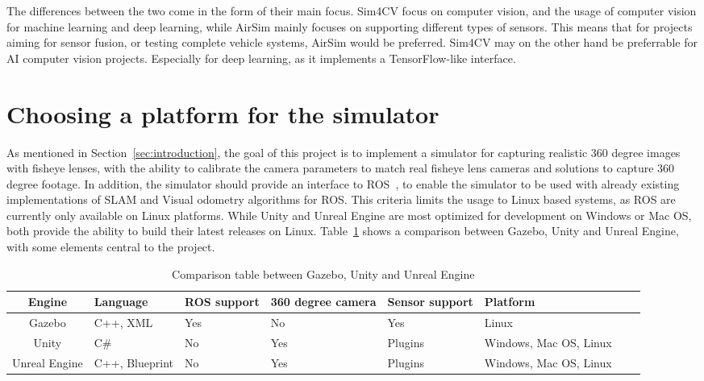 The differences between the two come in the form of their main focus. Sim4CV focus on computer vision, and the usage of computer vision for machine learning and deep learning, while AirSim mainly focuses on supporting different types of sensors. This means that for projects aiming for sensor fusion, or testing complete vehicle systems, AirSim would be preferred. Sim4CV may on the other hand be preferrable for AI computer vision projects. Especially for deep learning, as it implements a TensorFlow-like interface.

\section{Choosing a platform for the simulator}

As mentioned in Section~\ref{sec:introduction}, the goal of this project is to implement a simulator for capturing realistic 360 degree images with fisheye lenses, with the ability to calibrate the camera parameters to match real fisheye lens cameras and solutions to capture 360 degree footage. In addition, the simulator should provide an interface to ROS~\cite{ROSpaper}, to enable the simulator to be used with already existing implementations of SLAM and Visual odometry algorithms for ROS. This criteria limits the usage to Linux based systems, as ROS are currently only available on Linux platforms. While Unity and Unreal Engine are most optimized for development on Windows or Mac OS, both provide the ability to build their latest releases on Linux. Table~\ref{tab:platform_comparison} shows a comparison between Gazebo, Unity and Unreal Engine, with some elements central to the project.

\begin{table}[!htb]
    \centering
    \begin{tabular}{|c|>{\centering\arraybackslash}m{2cm}|>{\centering\arraybackslash}m{2cm}|>{\centering\arraybackslash}m{2.5cm}|>{\centering\arraybackslash}m{2cm}|>{\centering\arraybackslash}m{2cm}|>{\centering\arraybackslash}m{2cm}|>{\centering\arraybackslash}m{2cm}|} \hline
        \textbf{Engine}          & \textbf{Language}  & \textbf{ROS support} & \textbf{360 degree camera}   & \textbf{Sensor support} & \textbf{Platform}              \\ \hline \hline
        Gazebo          & C++, XML           & Yes           & No  & Yes & Linux                 \\ \hline
        Unity           & C\#                    & No            & Yes & Plugins & Windows, Mac OS, Linux \\ \hline
        Unreal Engine   & C++, Blueprint        & No            & Yes & Plugins & Windows, Mac OS, Linux \\ \hline
    \end{tabular}
    \caption{Comparison table between Gazebo, Unity and Unreal Engine}
    \label{tab:platform_comparison}
\end{table}

